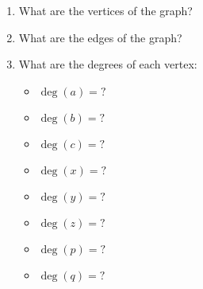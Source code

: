\documentclass[a4paper]{article}
\begin{document}
\begin{enumerate}
\item What are the vertices of the graph?
\item What are the edges of the graph?
\item What are the degrees of each vertex:
\begin{multicols}{2}
\begin{itemize}
\item $\deg(a)=?$
\item $\deg(b)=?$
\item $\deg(c)=?$
\item $\deg(x)=?$
\item $\deg(y)=?$
\item $\deg(z)=?$
\item $\deg(p)=?$
\item $\deg(q)=?$
\end{itemize}
\end{multicols}
\end{enumerate}
\end{document}
